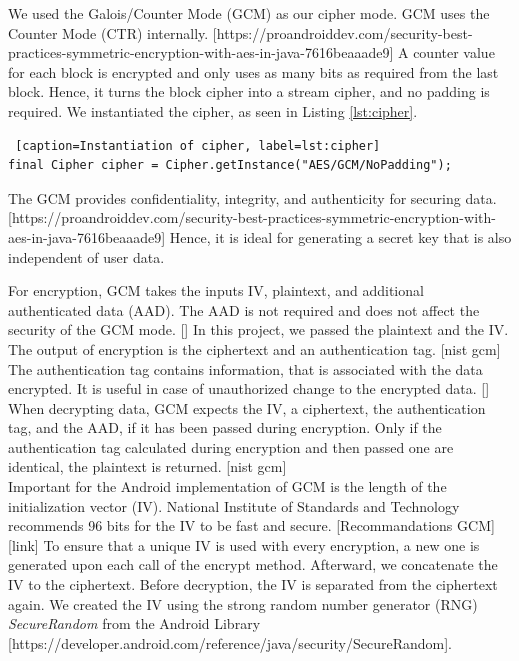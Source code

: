 We used the Galois/Counter Mode (GCM) as our cipher mode. GCM uses the Counter Mode (CTR) internally. [https://proandroiddev.com/security-best-practices-symmetric-encryption-with-aes-in-java-7616beaaade9] A counter value for each block is encrypted and only uses as many bits as required from the last block. Hence, it turns the block cipher into a stream cipher, and no padding is required. %
We instantiated the cipher, as seen in Listing \ref{lst:cipher}.

\begin{lstlisting} [caption=Instantiation of cipher, label=lst:cipher]
final Cipher cipher = Cipher.getInstance("AES/GCM/NoPadding");
\end{lstlisting}


The GCM provides confidentiality, integrity, and authenticity for securing data. [https://proandroiddev.com/security-best-practices-symmetric-encryption-with-aes-in-java-7616beaaade9] Hence, it is ideal for generating a secret key that is also independent of user data.

For encryption, GCM takes the inputs IV, plaintext, and additional authenticated data (AAD). The AAD is not required and does not affect the security of the GCM mode. []%
In this project, we passed the plaintext and the IV. The output of encryption is the ciphertext and an authentication tag. [nist gcm] The authentication tag contains information, that is associated with the data encrypted. It is useful in case of unauthorized change to the encrypted data. [] %
When decrypting data, GCM expects the IV, a ciphertext, the authentication tag, and the AAD, if it has been passed during encryption.
Only if the authentication tag calculated during encryption and then passed one are identical, the plaintext is returned. [nist gcm] \\

Important for the Android implementation of GCM is the length of the initialization vector (IV). National Institute of Standards and Technology recommends 96 bits for the IV to be fast and secure. [Recommandations GCM] [link] To ensure that a unique IV is used with every encryption, a new one is generated upon each call of the encrypt method. Afterward, we concatenate the IV to the ciphertext. Before decryption, the IV is separated from the ciphertext again. We created the IV using the strong random number generator (RNG) \textit{SecureRandom} from the Android Library [https://developer.android.com/reference/java/security/SecureRandom]. \\

